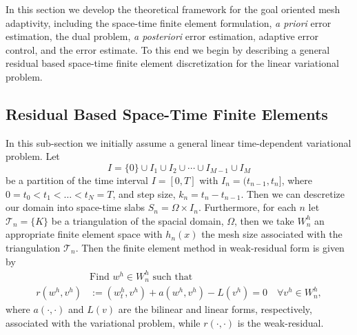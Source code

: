 In this section we develop the theoretical framework for the goal oriented mesh
adaptivity, including the space-time finite element formulation, \emph{a priori}
error estimation, the dual problem, \emph{a posteriori} error estimation,
adaptive error control, and the error estimate. To this end we begin by
describing a general residual based space-time finite element discretization for
the linear variational problem.

\subsection{Residual Based Space-Time Finite Elements} \label{sse:STFE}
In this sub-section we initially assume a general linear time-dependent
variational problem. Let
\begin{equation*}
    I = \{0\} \cup I_1 \cup I_2 \cup \cdots \cup I_{M-1} \cup I_M
\end{equation*}
be a partition of the time interval $I = [0, T]$ with $I_n = (t_{n-1}, t_n]$,
where $0=t_0 < t_1 < \ldots < t_N = T$, and step size, $k_n = t_n - t_{n-1}$.
Then we can descretize our domain into space-time slabs $S_n = \Omega \times
I_n$. Furthermore, for each $n$ let $\mathcal{T}_n= \{K\}$ be a triangulation
of the spacial domain, $\Omega$, then we take $W_n^h$ an appropriate finite
element space with $h_n(x)$ the mesh size associated with the triangulation
$\mathcal{T}_n$. Then the finite element method in weak-residual form is given
by
\begin{equation}
    \begin{split}
        &\text{Find } w^h \in W^h_n \text{ such that} \\
        r(w^h, v^h) &:= (w^h_t, v^h) + a(w^h, v^h) - L(v^h) = 0 \quad \forall
            v^h \in W^h_n,
    \end{split}
    \label{eq:WeakResidual}
\end{equation}
where $a(\cdot, \cdot)$ and $L(v)$ are the bilinear and linear forms,
respectively, associated with the variational problem, while $r(\cdot, \cdot)$
is the weak-residual.

